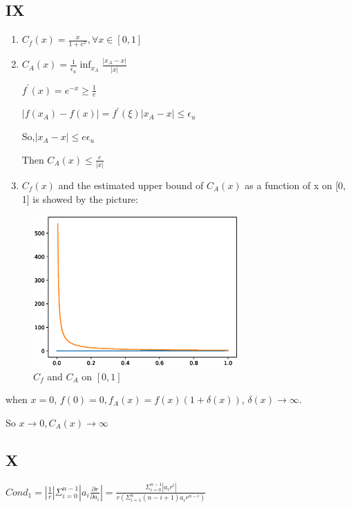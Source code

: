 \documentclass[12]{article}%
\begin{document}
        \subsection{IX}
            \begin{enumerate}
                \item $C_f(x)=\frac{x}{1+e^x},\forall x\in[0,1 ]$
                \item $C_A(x)=\frac{1}{\epsilon_u}\inf_{x_A}\frac{|x_A-x|}{|x|}$
                    
                        $f^{'}(x)=e^{-x}\ge \frac{1}{e}$

                        $|f(x_A)-f(x)|=f^{'}(\xi)|x_A-x|\le \epsilon_u$

                        So,$|x_A-x|\le e\epsilon_u$

                        Then $C_A(x)\le \frac{e}{|x|}$
                \item $C_f (x)$ and the estimated upper bound of $C_A(x)$ as a function of x on [0, 1] is showed by the picture:
            \end{enumerate}
            \begin{figure}[H]
                \centering
                \includegraphics[width=0.7\textwidth]{./pic/IX.eps}
                \caption{$C_f$ and $C_A$ on $[0, 1]$}
            \end{figure}

                when $x=0$, $f(0)=0,f_A(x)=f(x)(1+\delta(x))$, $\delta(x)\rightarrow \infty$.

                So $x\rightarrow 0,C_A(x)\rightarrow \infty$

        \subsection{X}
            $Cond_1=|\frac{1}{r}|\Sigma_{i=0}^{n-1}|a_i\frac{\partial r}{\partial a_i}|=\frac{\Sigma_{i=0}^{n-1}|a_ir^i|}{r(\Sigma_{i=1}^{n}(n-i+1)a_ir^{n-i})}$
\end{document}
